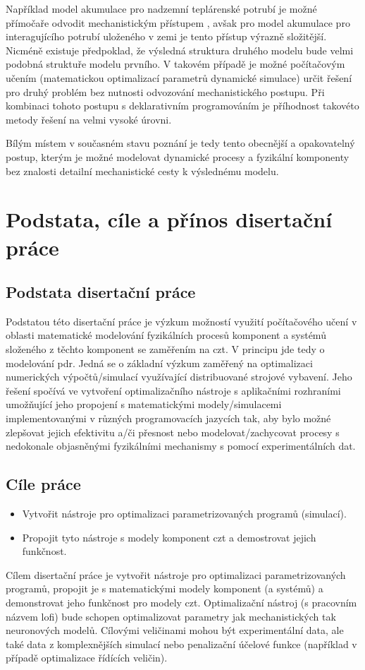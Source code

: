 Například model akumulace pro nadzemní teplárenské potrubí je možné přímočaře
odvodit mechanistickým přístupem \cite{Kudela2019pipe}, avšak pro model
akumulace pro interagujícího potrubí uloženého v zemi je tento přístup výrazně
složitější. Nicméně existuje předpoklad, že výsledná struktura druhého modelu
bude velmi podobná struktuře modelu prvního. V takovém případě je možné
počítačovým učením (matematickou optimalizací parametrů dynamické simulace)
určit řešení pro druhý problém bez nutnosti odvozování mechanistického postupu.
Při kombinaci tohoto postupu s deklarativním programováním je příhodnost
takovéto metody řešení na velmi vysoké úrovni.

Bílým místem v současném stavu poznání je tedy tento obecnější a opakovatelný
postup, kterým je možné modelovat dynamické procesy a fyzikální komponenty bez
znalosti detailní mechanistické cesty k výslednému modelu.

\chapter{Podstata, cíle a přínos disertační práce}
\label{chap:Aims_of_disertation}
\section{Podstata disertační práce}
\label{sec:Podstata}
Podstatou této disertační práce je výzkum možností využití počítačového učení
v oblasti matematické modelování fyzikálních procesů komponent a systémů
složeného z těchto komponent se zaměřením na \acrshort{czt}. V principu jde
tedy o modelování \acrshort{pdr}. Jedná se o základní výzkum zaměřený na
optimalizaci numerických výpočtů/simulací využívající distribuované strojové
vybavení. Jeho řešení spočívá ve vytvoření optimalizačního nástroje s
aplikačními rozhraními umožňující jeho propojení s matematickými
modely/simulacemi implementovanými v různých programovacích jazycích tak, aby
bylo možné zlepšovat jejich efektivitu a/či přesnost nebo modelovat/zachycovat
procesy s nedokonale objasněnými fyzikálními mechanismy s pomocí
experimentálních dat.
\section{Cíle práce}
\label{sec:Aims}
\begin{itemize}
  \item
    Vytvořit nástroje pro optimalizaci parametrizovaných programů (simulací).
  \item
    Propojit tyto nástroje s modely komponent \acrshort{czt} a demostrovat
    jejich funkčnost.
\end{itemize}
Cílem disertační práce je vytvořit nástroje pro optimalizaci parametrizovaných
programů, propojit je s matematickými modely komponent (a systémů) a
demonstrovat jeho funkčnost pro modely \acrshort{czt}. Optimalizační nástroj
(s pracovním názvem \acrshort{lofi}) bude schopen optimalizovat parametry jak
mechanistických tak neuronových modelů. Cílovými veličinami mohou být
experimentální data, ale také data z komplexnějších simulací nebo penalizační
účelové funkce (například v případě optimalizace řídících veličin).
